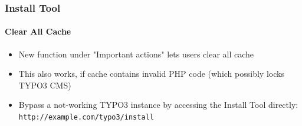 
\begin{frame}[fragile]
	\frametitle{Install Tool}
	\framesubtitle{Clear All Cache}

	\begin{itemize}
		\item New function under "Important actions" lets users clear all cache
		\item This also works, if cache contains invalid PHP code\newline
			(which possibly locks TYPO3 CMS)
		\item Bypass a not-working TYPO3 instance by accessing the Install Tool directly: \texttt{http://example.com/typo3/install}
	\end{itemize}


\end{frame}
